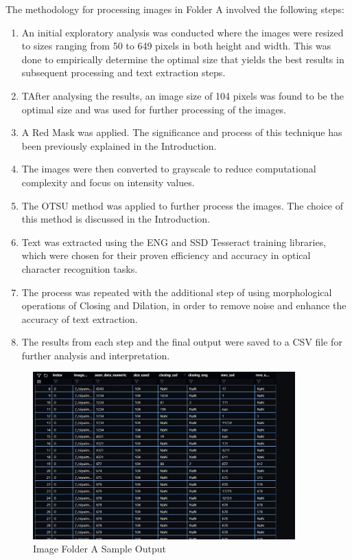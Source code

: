 The methodology for processing images in Folder A involved the following steps:

\begin{enumerate}
    \item An initial exploratory analysis was conducted where the images were resized to sizes ranging from 50 to 649 pixels in both height and width. This was done to empirically determine the optimal size that yields the best results in subsequent processing and text extraction steps.
    \item TAfter analysing the results, an image size of 104 pixels was found to be the optimal size and was used for further processing of the images.
    \item A Red Mask was applied. The significance and process of this technique has been previously explained in the Introduction.
    \item The images were then converted to grayscale to reduce computational complexity and focus on intensity values.
    \item The OTSU method was applied to further process the images. The choice of this method is discussed in the Introduction.
    \item Text was extracted using the ENG and SSD Tesseract training libraries, which were chosen for their proven efficiency and accuracy in optical character recognition tasks.
    \item The process was repeated with the additional step of using morphological operations of Closing and Dilation, in order to remove noise and enhance the accuracy of text extraction.
    \item The results from each step and the final output were saved to a CSV file for further analysis and interpretation.
\end{enumerate}

\begin{figure}[ht]
    \centering
    \includegraphics[width=0.9\textwidth]{Figures/Methodology/sipa_02/sample_output.jpg}
    \caption[Image Folder A Sample Output]{Image Folder A Sample Output}
    \label{fig:Image Folder A Sample Output}
\end{figure}

